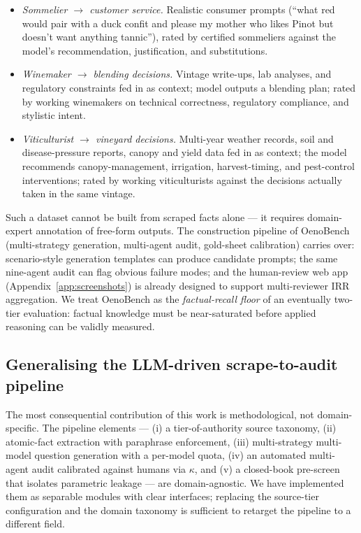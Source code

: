\begin{itemize}\itemsep -1pt
  \item \emph{Sommelier $\rightarrow$ customer service.} Realistic
    consumer prompts (``what red would pair with a duck confit and
    please my mother who likes Pinot but doesn't want anything tannic''),
    rated by certified sommeliers against the model's
    recommendation, justification, and substitutions.
  \item \emph{Winemaker $\rightarrow$ blending decisions.} Vintage
    write-ups, lab analyses, and regulatory constraints fed in as
    context; model outputs a blending plan; rated by working
    winemakers on technical correctness, regulatory compliance, and
    stylistic intent.
  \item \emph{Viticulturist $\rightarrow$ vineyard decisions.}
    Multi-year weather records, soil and disease-pressure reports,
    canopy and yield data fed in as context; the model recommends
    canopy-management, irrigation, harvest-timing, and pest-control
    interventions; rated by working viticulturists against the
    decisions actually taken in the same vintage.
\end{itemize}

Such a dataset cannot be built from scraped facts alone --- it requires
domain-expert annotation of free-form outputs. The construction
pipeline of OenoBench (multi-strategy generation, multi-agent audit,
gold-sheet calibration) carries over: scenario-style generation
templates can produce candidate prompts; the same nine-agent audit can
flag obvious failure modes; and the human-review web app
(Appendix~\ref{app:screenshots}) is already designed to support
multi-reviewer IRR aggregation. We treat OenoBench as the
\emph{factual-recall floor} of an eventually two-tier evaluation:
factual knowledge must be near-saturated before applied reasoning can
be validly measured.

\subsection{Generalising the LLM-driven scrape-to-audit pipeline}
The most consequential contribution of this work is methodological,
not domain-specific. The pipeline elements --- (i) a tier-of-authority
source taxonomy, (ii) atomic-fact extraction with paraphrase
enforcement, (iii) multi-strategy multi-model question generation with
a per-model quota, (iv) an automated multi-agent audit calibrated
against humans via $\kappa$, and (v) a closed-book pre-screen that
isolates parametric leakage --- are domain-agnostic. We have
implemented them as separable modules with clear interfaces;
replacing the source-tier configuration and the domain taxonomy is
sufficient to retarget the pipeline to a different field.

